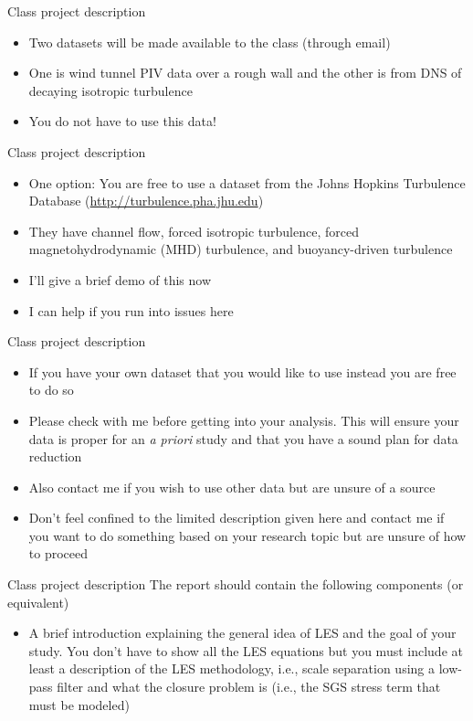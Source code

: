\begin{frame}{Class project description}
\begin{itemize}
	\item Two datasets will be made available to the class (through email)
	\item One is wind tunnel PIV data over a rough wall and the other is from DNS of decaying isotropic turbulence
	\item You do not have to use this data!
	\end{itemize}
\end{frame}

\begin{frame}{Class project description}
\begin{itemize}
	\item One option: You are free to use a dataset from the Johns Hopkins Turbulence Database (\url{http://turbulence.pha.jhu.edu})
	\item They have channel flow, forced isotropic turbulence, forced magnetohydrodynamic (MHD) turbulence, and buoyancy-driven turbulence
	\item I'll give a brief demo of this now
	\item I can help if you run into issues here
	\end{itemize}
\end{frame}

\begin{frame}{Class project description}
\begin{itemize}
	\item If you have your own dataset that you would like to use instead you are free to do so
	\item Please check with me before getting into your analysis.  This will ensure your data is proper for an {\it a priori} study and that you have a sound plan for data reduction
	\item Also contact me if you wish to use other data but are unsure of a source
	\item Don't feel confined to the limited description given here and contact me if you want to do something based on your research topic but are unsure of how to proceed
	\end{itemize}
\end{frame}

\begin{frame}{Class project description}
The report should contain the following components (or equivalent)
\begin{itemize}
	\item A brief introduction explaining the general idea of LES and the goal of your study. You don't have to show all the LES equations but you must include at least a description of the LES methodology, i.e., scale separation using a low-pass filter and what the closure problem is (i.e., the SGS stress term that must be modeled)
	\end{itemize}
\end{frame}


